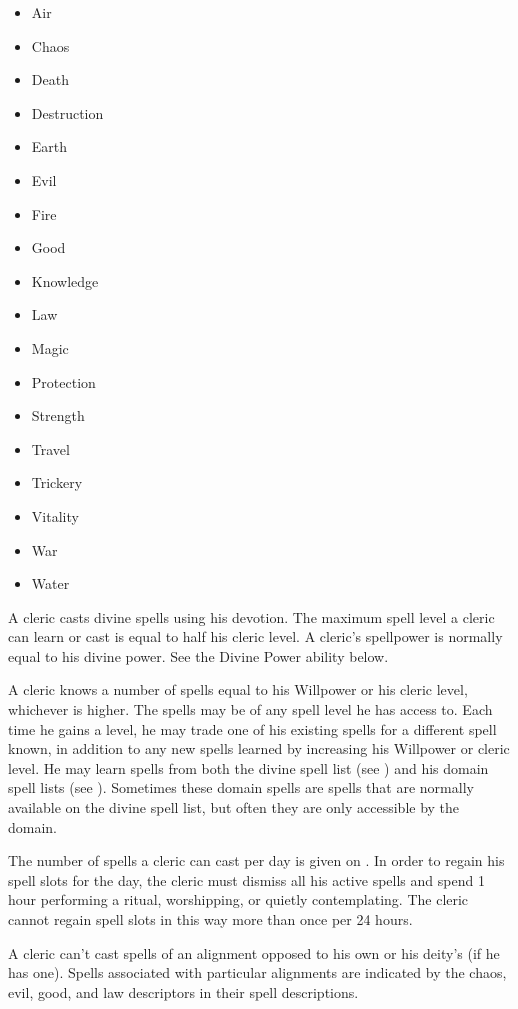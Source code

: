 \begin{itemize}
    \item{Air}
    \item{Chaos}
    \item{Death}
    \item{Destruction}
    \item{Earth}
    \item{Evil}
    \item{Fire}
    \item{Good}
    \item{Knowledge}
    \item{Law}
    \item{Magic}
    \item{Protection}
    \item{Strength}
    \item{Travel}
    \item{Trickery}
    \item{Vitality}
    \item{War}
    \item{Water}
\end{itemize}

A cleric casts divine spells using his devotion.
The maximum spell level a cleric can learn or cast is equal to half his cleric level.
A cleric's spellpower is normally equal to his divine power.
See the Divine Power ability below.

A cleric knows a number of spells equal to his Willpower or his cleric level, whichever is higher.
The spells may be of any spell level he has access to.
Each time he gains a level, he may trade one of his existing spells for a different spell known, in addition to any new spells learned by increasing his Willpower or cleric level.
He may learn spells from both the divine spell list (see ) and his domain spell lists (see ).
Sometimes these domain spells are spells that are normally available on the divine spell list, but often they are only accessible by the domain.

The number of spells a cleric can cast per day is given on .
In order to regain his spell slots for the day, the cleric must dismiss all his active spells and spend 1 hour performing a ritual, worshipping, or quietly contemplating.
The cleric cannot regain spell slots in this way more than once per 24 hours.

A cleric can't cast spells of an alignment opposed to his own or his deity's (if he has one).
Spells associated with particular alignments are indicated by the chaos, evil, good, and law descriptors in their spell descriptions.

